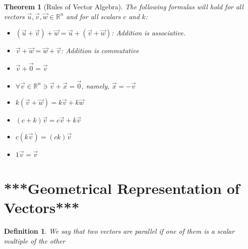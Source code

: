 \documentclass[10pt]{report}
\newtheorem{thm2}{Theorem}[section]
\newtheorem{def2}{Definition}[section]
\begin{document}
\begin{thm2}[Rules of Vector Algebra]
The following formulas will hold for all vectors $\vec{u}, \vec{v}, \vec{w}\in\mathbb{R}^n$ and for all scalars $c$ and $k$:
\begin{itemize}
\item[1.] $(\vec{u}+\vec{v})+\vec{w}= \vec{u}+(\vec{v}+\vec{w})$: Addition is associative.
\item[2.]$\vec{v}+\vec{w}=\vec{w}+\vec{v}$: Addition is commutative
\item[3.] $\vec{v}+\vec{0}=\vec{v}$
\item[4.] $\forall \vec{v}\in \mathbb{R}^n \ni \vec{v}+\vec{x} =\vec{0}$, namely, $\vec{x}=-\vec{v}$
\item[5.] $k(\vec{v}+\vec{w}) =k\vec{v}+k\vec{w}$
\item[6.] $(c+k)\vec{v} = c\vec{v}+ k\vec{v}$
\item[7.] $c(k\vec{v}) = (ck)\vec{v}$
\item[8.] $1\vec{v}=\vec{v}$
\end{itemize}
\end{thm2}
\section{***Geometrical Representation of Vectors***}
\begin{def2}
We say that two vectors are parallel if one of them is a scalar multiple of the other
\end{def2}
\end{document}
